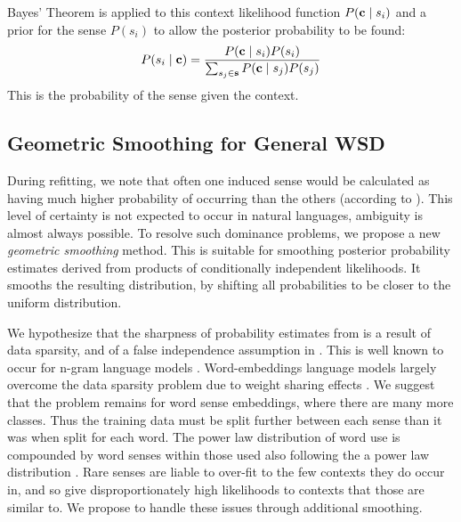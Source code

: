 {Bayes' Theorem is applied to this context likelihood function  $P(\mathbf{c} \mid s_{i})$ and a prior for the sense $P(s_i)$ to allow the posterior probability to be found:
\begin{equation} \label{eq:generalwsd}
P(s_{i} \mid \mathbf{c}) =
\dfrac{P(\mathbf{c} \mid s_{i})P(s_{i})}
{\sum_{s_{j}\in\mathbf{s}} P(\mathbf{c} \mid s_{j})P(s_{j})}
\end{equation}
This is the probability of the sense given the context.


\subsection{Geometric Smoothing for General WSD} \label{smoothing}
During refitting, we note that often one induced sense would be calculated as having much higher probability of occurring than the others (according to ).
This level of certainty is not expected to occur in natural languages, ambiguity is almost always possible. 
To resolve such dominance problems, we propose a new \emph{geometric smoothing} method.
This is suitable for smoothing posterior probability estimates derived from products of conditionally independent likelihoods.
It smooths the resulting distribution, by shifting all probabilities to be closer to the uniform distribution.

We hypothesize that the sharpness of probability estimates from  is a result of data sparsity, and of a false independence assumption in .
This is well known to occur for n-gram language models \cite{rosenfeld2000two}.
Word-embeddings language models largely overcome the data sparsity problem due to weight sharing effects \parencite{NPLM}.
We suggest that the problem remains for word sense embeddings, where there are many more classes.
Thus the training data must be split further between each sense than it was when split for each word. 
The power law distribution of word use \parencite{zipf1949human} is compounded by word senses within those used also following the a power law distribution \parencite{Kilgarriff2004}.
Rare senses are liable to over-fit to the few contexts they do occur in, and so give disproportionately high likelihoods to contexts that those are similar to.
We propose to handle these issues through additional smoothing.

}
